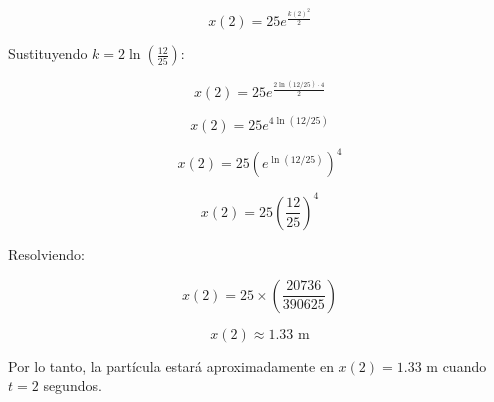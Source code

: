 \documentclass[answers]{exam}
\begin{document}
\[
	x(2) = 25 e^{\frac{k(2)^2}{2}}
\]

Sustituyendo \( k = 2 \ln \left(\frac{12}{25} \right) \):

\[
	x(2) = 25 e^{\frac{2 \ln(12/25) \cdot 4}{2}}
\]

\[
	x(2) = 25 e^{4 \ln(12/25)}
\]

\[
	x(2) = 25 \left( e^{\ln(12/25)} \right)^4
\]

\[
	x(2) = 25 \left(\frac{12}{25} \right)^4
\]

Resolviendo:

\[
	x(2) = 25 \times \left(\frac{20736}{390625} \right)
\]

\[
	x(2) \approx 1.33 \text{ m}
\]

Por lo tanto, la partícula estará aproximadamente en \( x(2) = 1.33 \) m cuando \( t = 2 \) segundos.
\end{document}
